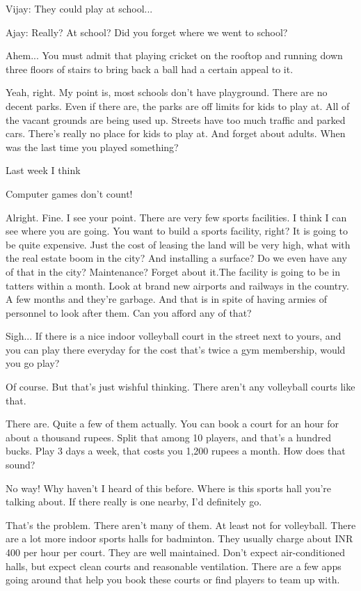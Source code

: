 Vijay: They could play at school...

{\color{blue} Ajay: Really? At school? Did you forget where we went to school?}

Ahem... You must admit that playing cricket on the rooftop and running down three floors of stairs to bring back a ball had a certain appeal to it. 

{\color{blue} Yeah, right. My point is, most schools don't have playground. There are no decent parks. Even if there are, the parks are off limits for kids to play at. All of the vacant grounds are being used up. Streets have too much traffic and parked cars. There's really no place for kids to play at. And forget about adults. When was the last time you played something?}

Last week I think

{\color{blue} Computer games don't count!}

Alright. Fine. I see your point. There are very few sports facilities. I think I can see where you are going. You want to build a sports facility, right? It is going to be quite expensive. Just the cost of leasing the land will be very high, what with the real estate boom in the city? And installing a surface? Do we even have any of that in the city? Maintenance? Forget about it.The facility is going to be in tatters within a month. Look at brand new airports and railways in the country. A few months and they're garbage. And that is in spite of having armies of personnel to look after them. Can you afford any of that?

{\color{blue} Sigh... If there is a nice indoor volleyball court in the street next to yours, and you can play there everyday for the cost that's twice a gym membership, would you go play?}

Of course. But that's just wishful thinking. There aren't any volleyball courts like that. 

{\color{blue} There are. Quite a few of them actually. You can book a court for an hour for about a thousand rupees. Split that among 10 players, and that's a hundred bucks. Play 3 days a week, that costs you 1,200 rupees a month. How does that sound?}

No way! Why haven't I heard of this before. Where is this sports hall you're talking about. If there really is one nearby, I'd definitely go. 

{\color{blue} That's the problem. There aren't many of them. At least not for volleyball. There are a lot more indoor sports halls for badminton. They usually charge about INR 400 per hour per court. They are well maintained. Don't expect air-conditioned halls, but expect clean courts and reasonable ventilation. There are a few apps going around that help you book these courts or find players to team up with.}

